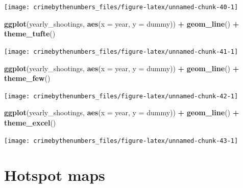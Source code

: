 \documentclass[
  12pt,
]{book}
\newenvironment{Shaded}{\begin{snugshade}}{\end{snugshade}}
\newcommand{\DataTypeTok}[1]{\textcolor[rgb]{0.27,0.27,0.27}{#1}}
\newcommand{\KeywordTok}[1]{\textcolor[rgb]{0.27,0.27,0.27}{\textbf{#1}}}
\newcommand{\NormalTok}[1]{#1}
\newcommand{\OperatorTok}[1]{\textcolor[rgb]{0.43,0.43,0.43}{\textbf{#1}}}
\newcommand{\StringTok}[1]{\textcolor[rgb]{0.5,0.5,0.5}{#1}}
\begin{document}
\begin{center}\texttt{[image: crimebythenumbers\_files/figure-latex/unnamed-chunk-40-1]} \end{center}

\begin{Shaded}
\begin{Highlighting}[]
\KeywordTok{ggplot}\NormalTok{(yearly\_shootings, }\KeywordTok{aes}\NormalTok{(}\DataTypeTok{x =}\NormalTok{ year, }\DataTypeTok{y =}\NormalTok{ dummy)) }\OperatorTok{+}
\StringTok{  }\KeywordTok{geom\_line}\NormalTok{() }\OperatorTok{+}
\StringTok{  }\KeywordTok{theme\_tufte}\NormalTok{()}
\end{Highlighting}
\end{Shaded}

\begin{center}\texttt{[image: crimebythenumbers\_files/figure-latex/unnamed-chunk-41-1]} \end{center}

\begin{Shaded}
\begin{Highlighting}[]
\KeywordTok{ggplot}\NormalTok{(yearly\_shootings, }\KeywordTok{aes}\NormalTok{(}\DataTypeTok{x =}\NormalTok{ year, }\DataTypeTok{y =}\NormalTok{ dummy)) }\OperatorTok{+}
\StringTok{  }\KeywordTok{geom\_line}\NormalTok{() }\OperatorTok{+}
\StringTok{  }\KeywordTok{theme\_few}\NormalTok{()}
\end{Highlighting}
\end{Shaded}

\begin{center}\texttt{[image: crimebythenumbers\_files/figure-latex/unnamed-chunk-42-1]} \end{center}

\begin{Shaded}
\begin{Highlighting}[]
\KeywordTok{ggplot}\NormalTok{(yearly\_shootings, }\KeywordTok{aes}\NormalTok{(}\DataTypeTok{x =}\NormalTok{ year, }\DataTypeTok{y =}\NormalTok{ dummy)) }\OperatorTok{+}
\StringTok{  }\KeywordTok{geom\_line}\NormalTok{() }\OperatorTok{+}
\StringTok{  }\KeywordTok{theme\_excel}\NormalTok{()}
\end{Highlighting}
\end{Shaded}

\begin{center}\texttt{[image: crimebythenumbers\_files/figure-latex/unnamed-chunk-43-1]} \end{center}

\hypertarget{hotspot-maps}{%
\chapter{Hotspot maps}\label{hotspot-maps}}
\end{document}
